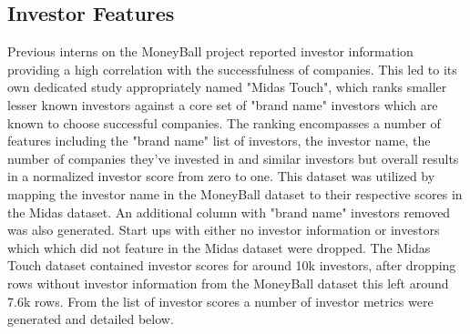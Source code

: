 \documentclass{article}
\begin{document}
\subsection{Investor Features}

Previous interns on the MoneyBall project reported investor information providing a high correlation with the successfulness of companies. This led to its own dedicated study appropriately named "Midas Touch", which ranks smaller lesser known investors against a core set of "brand name" investors which are known to choose successful companies. The ranking encompasses a number of features including the "brand name" list of investors, the investor name, the number of companies they've invested in and similar investors but overall results in a normalized investor score from zero to one. This dataset was utilized by mapping the investor name in the MoneyBall dataset to their respective scores in the Midas dataset. An additional column with "brand name" investors removed was also generated. Start ups with either no investor information or investors which which did not feature in the Midas dataset were dropped. The Midas Touch dataset contained investor scores for around 10k investors, after dropping rows without investor information from the MoneyBall dataset this left around 7.6k rows. From the list of investor scores a number of investor metrics were generated and detailed below.
\end{document}
